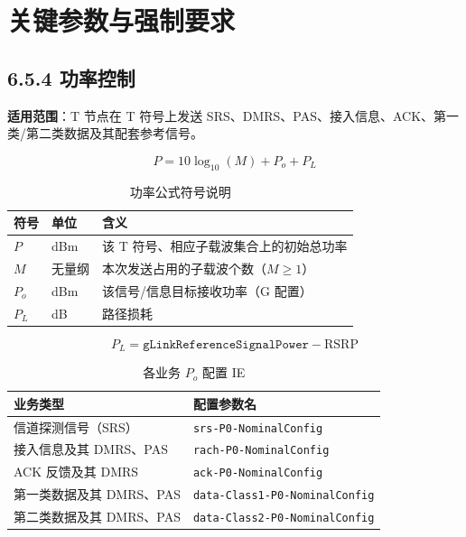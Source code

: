 \documentclass[11pt,a4paper]{ctexart}
\begin{document}
\section{关键参数与强制要求}

\subsection{6.5.4 功率控制}

\textbf{适用范围}：T 节点在 T 符号上发送 SRS、DMRS、PAS、接入信息、ACK、第一类/第二类数据及其配套参考信号。

\begin{equation}
P = 10\log_{10}(M) + P_o + P_L
\label{eq:power}
\end{equation}

\begin{longtable}{L{2.2cm}L{2.2cm}L{9.5cm}}
\caption{功率公式符号说明\label{tab:6545-pwr-sym}} \\
\toprule
\textbf{符号} & \textbf{单位} & \textbf{含义} \\
\midrule
$P$ & dBm & 该 T 符号、相应子载波集合上的初始总功率 \\
$M$ & 无量纲 & 本次发送占用的子载波个数（$M\geq 1$） \\
$P_o$ & dBm & 该信号/信息目标接收功率（G 配置） \\
$P_L$ & dB & 路径损耗 \\
\bottomrule
\end{longtable}

\begin{equation}
P_L = \texttt{gLinkReferenceSignalPower} - \mathrm{RSRP}
\label{eq:pl}
\end{equation}

\begin{longtable}{L{6.5cm}L{7.5cm}}
\caption{各业务 $P_o$ 配置 IE\label{tab:6545-p0}} \\
\toprule
\textbf{业务类型} & \textbf{配置参数名} \\
\midrule
信道探测信号（SRS） & \texttt{srs-P0-NominalConfig} \\
接入信息及其 DMRS、PAS & \texttt{rach-P0-NominalConfig} \\
ACK 反馈及其 DMRS & \texttt{ack-P0-NominalConfig} \\
第一类数据及其 DMRS、PAS & \texttt{data-Class1-P0-NominalConfig} \\
第二类数据及其 DMRS、PAS & \texttt{data-Class2-P0-NominalConfig} \\
\bottomrule
\end{longtable}
\end{document}
